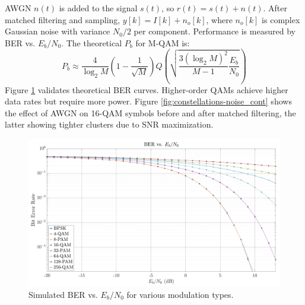 \documentclass[11pt]{article}
\begin{document}
	AWGN $n(t)$ is added to the signal $s(t)$, so $r(t) = s(t) + n(t)$. After matched filtering and sampling, $y[k] = I[k] + n_o[k]$, where $n_o[k]$ is complex Gaussian noise with variance $N_0/2$ per component. Performance is measured by BER vs. $E_b/N_0$. The theoretical $P_b$ for M-QAM is:
	\begin{equation}
		P_b \approx \frac{4}{\log_2 M} \left(1 - \frac{1}{\sqrt{M}}\right) Q\left(\sqrt{\frac{3 (\log_2 M)^2}{M-1} \frac{E_b}{N_0}}\right)
	\end{equation}
	Figure \ref{fig:ber-mod_cont} validates theoretical BER curves. Higher-order QAMs achieve higher data rates but require more power. Figure \ref{fig:constellations-noise_cont} shows the effect of AWGN on 16-QAM symbols before and after matched filtering, the latter showing tighter clusters due to SNR maximization.
	
	\begin{figure}[H]
		\centering
		\includegraphics[width=0.7\linewidth]{Images/ber-mod.png}
		\caption{Simulated BER vs. $E_b/N_0$ for various modulation types.}
		\label{fig:ber-mod_cont}
	\end{figure}
	
\end{document}
